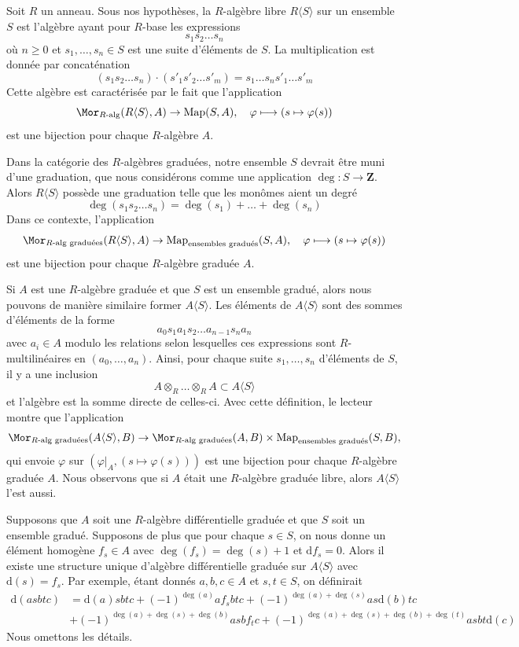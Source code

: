 \noindent
Soit $R$ un anneau. Sous nos hypothèses, la $R$-algèbre libre $R\langle
S \rangle$ sur un ensemble $S$ est l'algèbre ayant pour $R$-base les expressions
$$
s_1 s_2 \ldots s_n
$$
où $n \geq 0$ et $s_1, \ldots, s_n \in S$ est une suite d'éléments de $S$. La
multiplication est donnée par concaténation
$$
(s_1 s_2 \ldots s_n) \cdot (s'_1 s'_2 \ldots s'_m) =
s_1 \ldots s_n s'_1 \ldots s'_m
$$
Cette algèbre est caractérisée par le fait que l'application
$$
\Mor_{R\text{-alg}}(R\langle S \rangle, A) \to
\text{Map}(S, A),\quad
\varphi \longmapsto (s \mapsto \varphi(s))
$$
est une bijection pour chaque $R$-algèbre $A$.

\medskip\noindent
Dans la catégorie des $R$-algèbres graduées, notre ensemble $S$ devrait être muni
d'une graduation, que nous considérons comme une application $\deg : S \to
\mathbf{Z}$. Alors $R\langle S\rangle$ possède une graduation telle que les
monômes aient un degré
$$
\deg(s_1 s_2 \ldots s_n) = \deg(s_1) + \ldots + \deg(s_n)
$$
Dans ce contexte, l'application
$$
\Mor_{\text{}R\text{-alg graduées}}(R\langle S \rangle, A) \to
\text{Map}_{\text{ensembles gradués}}(S, A),\quad
\varphi \longmapsto (s \mapsto \varphi(s))
$$
est une bijection pour chaque $R$-algèbre graduée $A$.

\medskip\noindent
Si $A$ est une $R$-algèbre graduée et que $S$ est un ensemble gradué, alors nous
pouvons de manière similaire former $A\langle S \rangle$. Les éléments de
$A\langle S \rangle$ sont des sommes d'éléments de la forme
$$
a_0 s_1 a_1 s_2 \ldots a_{n - 1} s_n a_n
$$
avec $a_i \in A$ modulo les relations selon lesquelles ces expressions sont
$R$-multilinéaires en $(a_0, \ldots, a_n)$. Ainsi, pour chaque suite $s_1, \ldots,
s_n$ d'éléments de $S$, il y a une inclusion
$$
A \otimes_R \ldots \otimes_R A \subset A\langle S \rangle
$$
et l'algèbre est la somme directe de celles-ci. Avec cette définition, le lecteur
montre que l'application
$$
\Mor_{\text{}R\text{-alg graduées}}(A\langle S \rangle, B) \to
\Mor_{\text{}R\text{-alg graduées}}(A, B) \times
\text{Map}_{\text{ensembles gradués}}(S, B),
$$
qui envoie $\varphi$ sur $(\varphi|_A, (s \mapsto \varphi(s)))$ est une bijection
pour chaque $R$-algèbre graduée $A$. Nous observons que si $A$ était une
$R$-algèbre graduée libre, alors $A\langle S \rangle$ l'est aussi.

\medskip\noindent
Supposons que $A$ soit une $R$-algèbre différentielle graduée et que $S$ soit un
ensemble gradué. Supposons de plus que pour chaque $s \in S$, on nous donne un
élément homogène $f_s \in A$ avec $\deg(f_s) = \deg(s) + 1$ et $\text{d}f_s = 0$.
Alors il existe une structure unique d'algèbre différentielle graduée sur
$A\langle S \rangle$ avec $\text{d}(s) = f_s$. Par exemple, étant donnés $a, b, c \in A$
et $s, t \in S$, on définirait
\begin{align*}
\text{d}(asbtc)
& =
\text{d}(a)sbtc + (-1)^{\deg(a)}a f_s b t c +
(-1)^{\deg(a) + \deg(s)} as\text{d}(b)tc \\
& + (-1)^{\deg(a) + \deg(s) + \deg(b)} asb f_t c +
(-1)^{\deg(a) + \deg(s) + \deg(b) + \deg(t)} asbt\text{d}(c)
\end{align*}
Nous omettons les détails.

